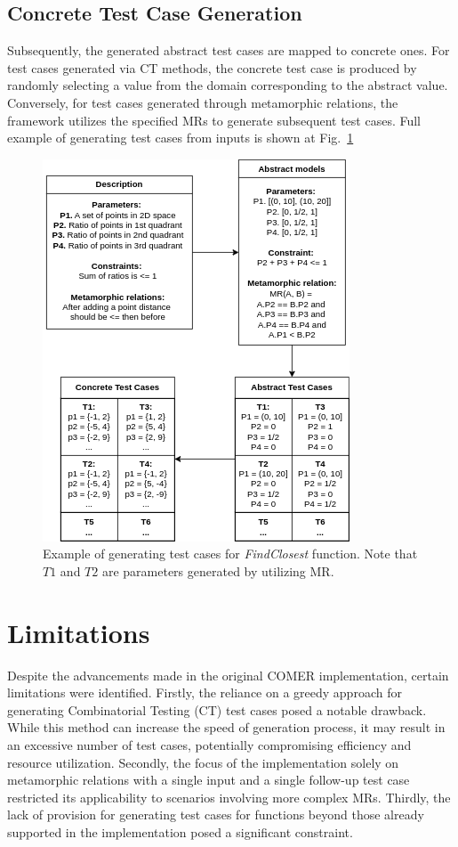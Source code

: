 \subsection{Concrete Test Case Generation}\label{subsec:concrete-test-case-generation}

Subsequently, the generated abstract test cases are mapped to concrete ones.
For test cases generated via CT methods, the concrete test case is produced by randomly selecting a value from the domain corresponding to the abstract value.
Conversely, for test cases generated through metamorphic relations, the framework utilizes the specified MRs to generate subsequent test cases. Full example of generating test cases from inputs is shown at Fig.~\ref{fig:comer_example}

\begin{figure}[hbt]
    \centering
    \includegraphics[]{figs/test_cases.png}
    \caption{Example of generating test cases for \textit{FindClosest} function. Note that $T1$ and $T2$ are parameters generated by utilizing MR.}
    \label{fig:comer_example}
\end{figure}


\section{Limitations}\label{sec:limitations}

Despite the advancements made in the original COMER implementation, certain limitations were identified.
Firstly, the reliance on a greedy approach for generating Combinatorial Testing (CT) test cases posed a notable drawback.
While this method can increase the speed of generation process, it may result in an excessive number of test cases, potentially compromising efficiency and resource utilization.
Secondly, the focus of the implementation solely on metamorphic relations with a single input and a single follow-up test case restricted its applicability to scenarios involving more complex MRs. Thirdly, the lack of provision for generating test cases for functions beyond those already supported in the implementation posed a significant constraint.

